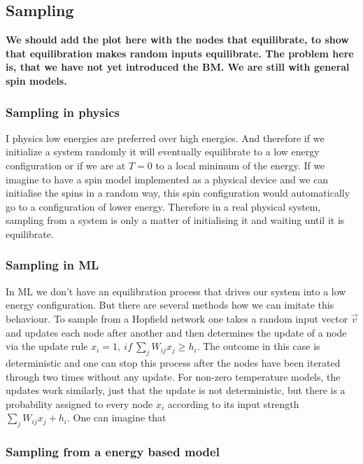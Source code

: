 \documentclass[nofootinbib, superscriptaddress, prl]{revtex4}
\begin{document}
\subsection{Sampling}

\textbf{We should add the plot here with the nodes that equilibrate, to show that equilibration makes random inputs equilibrate. The problem here is, that we have not yet introduced the BM. We are still with general spin models.}

\subsubsection{Sampling in physics}

I physics low energies are preferred over high energies. 
And therefore if we initialize a system randomly it will eventually equilibrate to a low energy configuration or if we are at $T=0$ to a local minimum of the energy.
If we imagine to have a spin model implemented as a physical device and we can initialise the spins in a random way, this spin configuration would automatically go to a configuration of lower energy.
Therefore in a real physical system, sampling from a system is only a matter of initialising it and waiting until it is equilibrate.

\subsubsection{Sampling in ML}

In ML we don't have an equilibration process that drives our system into a low energy configuration. But there are several methods how we can imitate this behaviour.
To sample from a Hopfield network one takes a random input vector $\vec{v}$ and updates each node after another and then determines the update of a node via the update rule $x_i = 1,~ if~\sum_j W_{ij} x_j \geq h_i$. The outcome in this case is deterministic and one can stop this process after the nodes have been iterated through two times without any update.
For non-zero temperature models, the updates work similarly, just that the update is not deterministic, but there is a probability assigned to every node $x_i$ according to its input strength $\sum_j W_{ij} x_j + h_i$. One can imagine that 


\subsubsection{Sampling from a energy based model}
\end{document}
